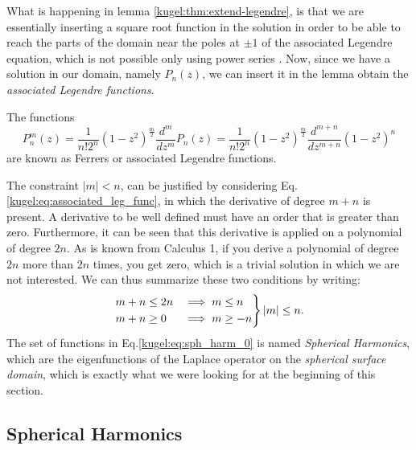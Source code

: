 What is happening in lemma \ref{kugel:thm:extend-legendre}, is that we are
essentially inserting a square root function in the solution in order to be able
to reach the parts of the domain near the poles at $\pm 1$ of the associated
Legendre equation, which is not possible only using power series
. Now, since
we have a solution in our domain, namely $P_n(z)$, we can insert it in the lemma 
obtain the \emph{associated Legendre functions}.

\begin{definition}
  \label{kugel:def:ferrers-functions}
  The functions
  \begin{equation}
    P^m_n (z) = \frac{1}{n!2^n}(1-z^2)^{\frac{m}{2}}\frac{d^{m}}{dz^{m}} P_n(z)
      = \frac{1}{n!2^n}(1-z^2)^{\frac{m}{2}}\frac{d^{m+n}}{dz^{m+n}}(1-z^2)^n 
  \end{equation}
  are known as Ferrers or associated Legendre functions.
\end{definition}


The constraint $|m|<n$, can be justified by considering Eq.\eqref{kugel:eq:associated_leg_func}, in which the derivative of degree $m+n$ is present. A derivative to be well defined must have an order that is greater than zero. Furthermore, it can be seen that this derivative is applied on a polynomial of degree $2n$. As is known from Calculus 1, if you derive a polynomial of degree $2n$ more than $2n$ times, you get zero, which is a trivial solution in which we are not interested.\newline
We can thus summarize these two conditions by writing:
\begin{equation*}
    \begin{rcases}
        m+n \leq 2n &\implies m \leq n \\
        m+n \geq 0  &\implies  m \geq -n
    \end{rcases} |m| \leq n.
\end{equation*}
The set of functions in Eq.\eqref{kugel:eq:sph_harm_0} is named \emph{Spherical Harmonics}, which are the eigenfunctions of the Laplace operator on the \emph{spherical surface domain}, which is exactly what we were looking for at the beginning of this section.
\fi

\subsection{Spherical Harmonics}

